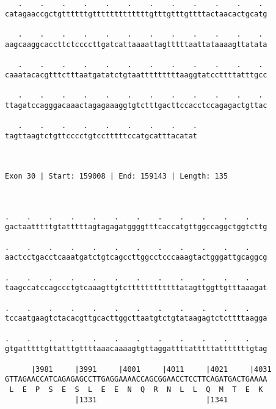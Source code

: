 \documentclass{article}
\begin{document}
\begin{Verbatim}
   .    .    .    .    .    .    .    .    .    .    .    . 
catagaaccgctgttttttgtttttttttttttgtttgtttgttttactaacactgcatg
                                                            
   .    .    .    .    .    .    .    .    .    .    .    . 
aagcaaggcaccttctccccttgatcattaaaattagtttttaattataaaagttatata
                                                            
   .    .    .    .    .    .    .    .    .    .    .    . 
caaatacacgtttctttaatgatatctgtaatttttttttaaggtatccttttatttgcc
                                                            
   .    .    .    .    .    .    .    .    .    .    .    . 
ttagatccagggacaaactagagaaaggtgtctttgacttccacctccagagactgttac
                                                            
   .    .    .    .    .    .    .    .    .
tagttaagtctgttcccctgtcctttttccatgcatttacatat
                                            
                                            
 
Exon 30 | Start: 159008 | End: 159143 | Length: 135



.    .    .    .    .    .    .    .    .    .    .    .    
gactaatttttgtatttttagtagagatggggtttcaccatgttggccaggctggtcttg
                                                            
.    .    .    .    .    .    .    .    .    .    .    .    
aactcctgacctcaaatgatctgtcagccttggcctcccaaagtactgggattgcaggcg
                                                            
.    .    .    .    .    .    .    .    .    .    .    .    
taagccatccagccctgtcaaagttgtcttttttttttttatagttggttgtttaaagat
                                                            
.    .    .    .    .    .    .    .    .    .    .    .    
tccaatgaagtctacacgttgcacttggcttaatgtctgtataagagtctcttttaagga
                                                            
.    .    .    .    .    .    .    .    .    .    .    .    
gtgatttttgttatttgttttaaacaaaagtgttaggattttatttttatttttttgtag
                                                            
      |3981     |3991     |4001     |4011     |4021     |4031
GTTAGAACCATCAGAGAGCCTTGAGGAAAACCAGCGGAACCTCCTTCAGATGACTGAAAA
 L  E  P  S  E  S  L  E  E  N  Q  R  N  L  L  Q  M  T  E  K 
                |1331                         |1341         
  

\end{Verbatim}
\end{document}
